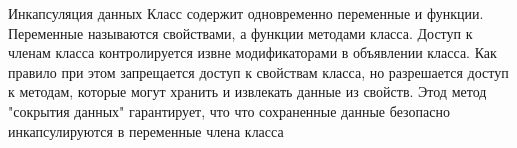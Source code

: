 Инкапсуляция данных
Класс содержит одновременно переменные и функции. Переменные называются свойствами, а функции методами класса. Доступ к членам класса контролируется извне модификаторами в объявлении класса. Как правило при этом запрещается доступ к свойствам класса, но разрешается доступ к методам, которые могут хранить и извлекать данные из свойств. Этод метод "сокрытия данных" гарантирует, что что сохраненные данные безопасно инкапсулируются в переменные члена класса